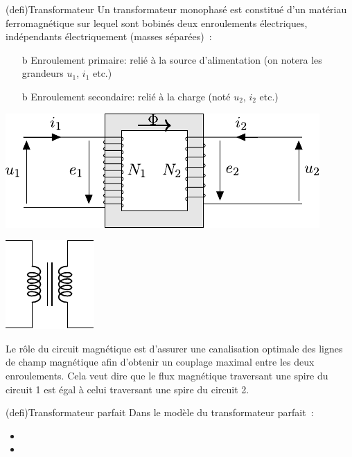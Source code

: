 \documentclass[../../main/main.tex]{subfiles}
\begin{document}
\begin{tcb*}(defi){Transformateur}
	Un transformateur monophasé est constitué d'un matériau ferromagnétique sur
	lequel sont bobinés deux enroulements électriques, indépendants
	électriquement (masses séparées)~:
	\begin{itemize}
		\item[b]{Enroulement primaire}: relié à la source d'alimentation (on notera
		les grandeurs $u_1$, $i_1$ etc.)
		\item[b]{Enroulement secondaire}: relié à la charge (noté $u_2$, $i_2$
		etc.)
	\end{itemize}
	\noindent
	\begin{minipage}[c]{.49\linewidth}
		\begin{center}
			\includegraphics[scale=1]{transfo_a.pdf}
		\end{center}
	\end{minipage}
	\hfill
	\begin{minipage}[c]{.49\linewidth}
		\begin{center}
			\includegraphics[scale=1]{transfo_c.pdf}
		\end{center}
	\end{minipage}
\end{tcb*}

Le rôle du circuit magnétique est d'assurer une canalisation optimale des lignes
de champ magnétique afin d'obtenir un couplage maximal entre les deux
enroulements. Cela veut dire que le flux magnétique traversant une spire du
circuit 1 est égal à celui traversant une spire du circuit 2.

\begin{tcb*}(defi){Transformateur parfait}
	Dans le modèle du transformateur parfait~:
	\begin{itemize}
		\item {}
		\item {}
	\end{itemize}
\end{tcb*}
\end{document}
